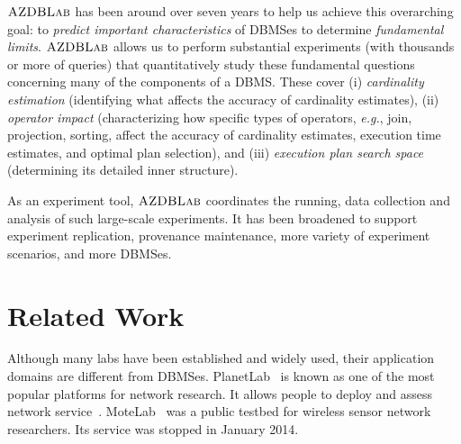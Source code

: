 \documentclass{vldb}
\def\azdb{\hbox{\sc AZDBLab}}
\begin{document}
$\azdb$ has been around over seven years to help us achieve this overarching goal: to {\em predict important 
\linebreak \hbox{characteristics}} of \hbox{DBMSes} to determine \hbox{{\em fundamental}} \linebreak \hbox{{\em limits}}. 
$\azdb$ allows us to perform substantial \linebreak \hbox{experiments} (with thousands or more of queries) that \linebreak \hbox{quantitatively} study these fundamental questions \hbox{concerning} many of the \hbox{components} of a \hbox{DBMS}. 
These cover (i) \linebreak \hbox{{\em cardinality}} \hbox{{\em estimation}} (identifying what affects the accuracy of \hbox{cardinality} \hbox{estimates}), 
(ii) {\em operator impact} (\hbox{characterizing} how specific types of \hbox{operators}, {\it e.g.}, join, projection, \hbox{sorting}, 
\hbox{affect} the \hbox{accuracy} of cardinality \hbox{estimates}, \hbox{execution} time estimates, and \hbox{optimal} plan selection), and 
(iii) {\em \hbox{execution} plan search space} (determining its detailed inner \hbox{structure}).

As an \hbox{experiment} tool, $\azdb$ coordinates the \linebreak \hbox{running}, data \hbox{collection} and analysis of such large-scale \linebreak \hbox{experiments}. 
It has been broadened to support \hbox{experiment} \hbox{replication}, \hbox{provenance} maintenance, more variety of 
\linebreak \hbox{experiment} \hbox{scenarios}, and more \hbox{DBMSes}. 

\section{Related Work}\label{sec:related_work} 

Although many labs have been established and widely used, their application domains are different from \hbox{DBMSes}. \hbox{PlanetLab}~\cite{Peterson2006planetlab} 
is known as one of the most \hbox{popular} \linebreak \hbox{platforms} for network research. It allows people to 
deploy and assess network service~\cite{Peterson2006planetlab}. 
\hbox{MoteLab}~\cite{WA05MoteLab} was a \hbox{public} 
\hbox{testbed} for wireless sensor network researchers. 
Its \hbox{service} was stopped in January 2014. 
\end{document}
